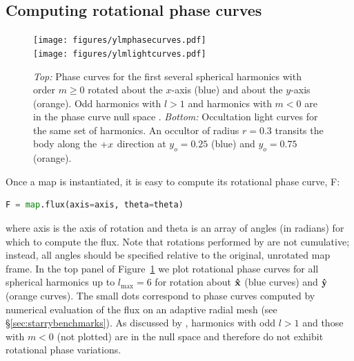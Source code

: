 \documentclass[modern]{aastex61}
\begin{document}
\subsection{Computing rotational phase curves}
\label{sec:starryphasecurves}
%
\begin{figure}[p!]
    \begin{centering}
    \texttt{[image: figures/ylmphasecurves.pdf]}
    \\[1em]
    \texttt{[image: figures/ylmlightcurves.pdf]}
    \caption{\label{fig:ylmlightcurves}
             \emph{Top:} Phase curves for the first several spherical
             harmonics with order $m \ge 0$ rotated about the $x$-axis
             (blue) and about the $y$-axis (orange).
             Odd harmonics with $l > 1$ and harmonics with $m < 0$ are
             in the phase curve null space \citep{CowanFuentesHaggard2013}.
             \emph{Bottom:} Occultation light curves for the same
             set of harmonics. An occultor of radius $r=0.3$
             transits the body along the $+\mbox{$x$}$ direction at $y_o = 0.25$
             (blue) and $y_o = 0.75$ (orange).
             }
    \end{centering}
\end{figure}
%
Once a map is instantiated, it is easy to compute its rotational
phase curve, \textsf{F}:
%
\begin{lstlisting}[language=Python,firstnumber=last]
F = map.flux(axis=axis, theta=theta)
\end{lstlisting}
%
where \textsf{axis} is the axis of rotation and \textsf{theta} is an array of
angles (in radians) for which to compute the flux. Note that rotations performed
by \flux are not cumulative; instead, all angles should be specified
relative to the original, unrotated map frame.
%
In the top panel of Figure~\ref{fig:ylmlightcurves} we plot rotational phase curves
for all spherical harmonics
up to $l_\mathrm{max} = 6$ for rotation about $\mathbf{\hat{x}}$ (blue curves) and $\mathbf{\hat{y}}$
(orange curves). The small dots correspond to phase curves computed by numerical
evaluation of the flux on an adaptive radial mesh (see \S\ref{sec:starrybenchmarks}).
As discussed by \citet{CowanFuentesHaggard2013}, harmonics with
odd $l > 1$ and those with $m < 0$ (not plotted) are in the null space and
therefore do not exhibit rotational phase variations.
\end{document}

